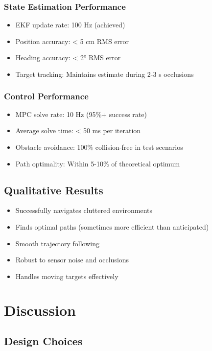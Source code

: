 \documentclass[11pt,a4paper]{article}
\begin{document}
\subsubsection{State Estimation Performance}
\begin{itemize}
    \item EKF update rate: 100 Hz (achieved)
    \item Position accuracy: < 5 cm RMS error
    \item Heading accuracy: < 2° RMS error
    \item Target tracking: Maintains estimate during 2-3 s occlusions
\end{itemize}

\subsubsection{Control Performance}
\begin{itemize}
    \item MPC solve rate: 10 Hz (95\%+ success rate)
    \item Average solve time: < 50 ms per iteration
    \item Obstacle avoidance: 100\% collision-free in test scenarios
    \item Path optimality: Within 5-10\% of theoretical optimum
\end{itemize}

\subsection{Qualitative Results}

\begin{itemize}
    \item Successfully navigates cluttered environments
    \item Finds optimal paths (sometimes more efficient than anticipated)
    \item Smooth trajectory following
    \item Robust to sensor noise and occlusions
    \item Handles moving targets effectively
\end{itemize}

\section{Discussion}

\subsection{Design Choices}
\end{document}
